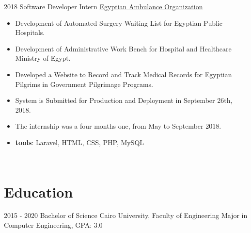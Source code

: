\documentclass[letterpaper]{twentysecondcv} %
\begin{document}
\begin{twenty}
    \twentyitem
   		{2018}
		{}
        {Software Developer Intern}
        {\href{http://www.eao.gov.eg/English/Pages/default.aspx/}{Egyptian Ambulance Organization}}
        {}
        {\vspace{-2mm}\begin{itemize}[topsep=0pt,partopsep=0pt]
				\item  Development of Automated Surgery Waiting List for Egyptian Public Hospitals.
        \item Development of Administrative Work Bench for Hospital and Healthcare Ministry of Egypt.
\item Developed a Website to Record and Track Medical Records for Egyptian Pilgrims in Government Pilgrimage Programs.
\item System is Submitted for Production and Deployment in September 26th, 2018.
\item The internship was a four months one, from May to September 2018.
				\item \textbf{tools}: Laravel, HTML, CSS, PHP, MySQL 
    \end{itemize}} \\
		

        
\end{twenty}

\vspace{-0.25cm}
\section{Education}{\faGraduationCap}

\begin{twenty} %
	\twentyitemshorttest
    	{2015 - 2020}
        {}
        {Bachelor of Science}
        {Cairo University, Faculty of Engineering}
        {Major in Computer Engineering, GPA: 3.0}

	
\end{twenty}
\end{document}
